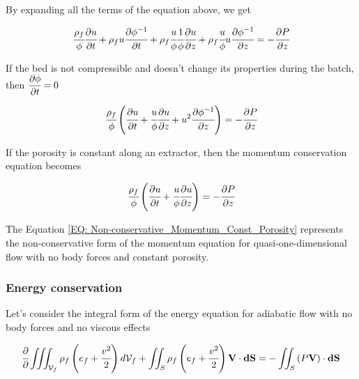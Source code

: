 \documentclass[../Article_Design_of_Experiment.tex]{subfiles}
\begin{document}
	By expanding all the terms of the equation above, we get
	
	{\footnotesize
		\begin{equation}
			\cfrac{\rho_f}{\phi} \cfrac{\partial u}{\partial t} + \rho_f u \cfrac{\partial \phi^{-1}}{\partial t} + \rho_f \cfrac{u}{\phi} \cfrac{1}{\phi} \cfrac{\partial u}{\partial z} + \rho_f \cfrac{u}{\phi} u \cfrac{\partial \phi^{-1} }{\partial z} = - \cfrac{\partial P}{\partial z}
		\end{equation}
	}
	
	If the bed is not compressible and doesn't change its properties during the batch, then ${\footnotesize\cfrac{\partial \phi}{\partial t}=0}$
	
	{\footnotesize
		\begin{equation}
			\cfrac{\rho_f}{\phi} \left( \cfrac{\partial u}{\partial t} + \cfrac{u}{\phi} \cfrac{\partial u}{\partial z} + u^2 \cfrac{\partial \phi^{-1}}{\partial z} \right) = -\cfrac{\partial P}{\partial z}
		\end{equation}
	}

	If the porosity is constant along an extractor, then the momentum conservation equation becomes
	
	{\footnotesize
		\begin{equation}
			\cfrac{\rho_f}{\phi} \left( \cfrac{\partial u}{\partial t} + \cfrac{u}{\phi} \cfrac{\partial u}{\partial z} \right) = -\cfrac{\partial P}{\partial z}
			\label{EQ: Non-conservative_Momentum_Const_Porosity}
		\end{equation}
	}

	The Equation \ref{EQ: Non-conservative_Momentum_Const_Porosity} represents the non-conservative form of the momentum equation for quasi-one-dimensional flow with no body forces and constant porosity.
	
	\subsubsection{Energy conservation}
	
	Let's consider the integral form of the energy equation for adiabatic flow with no body forces and no viscous effects
	
	{\footnotesize
		\begin{equation}
			\cfrac{\partial}{\partial} \iiint_{\mathcal{V}_f} \rho_f \left( e_f + \cfrac{v^2}{2} \right) d\mathcal{V}_f + \iint_S \rho_f \left( e_f + \cfrac{v^2}{2} \right) \textbf{V} \cdot \textbf{dS} = - \iint_S \left( P\textbf{V} \right) \cdot \textbf{dS}
			\label{EQ: Energy_equation_integral}
		\end{equation}
	}
\end{document}
